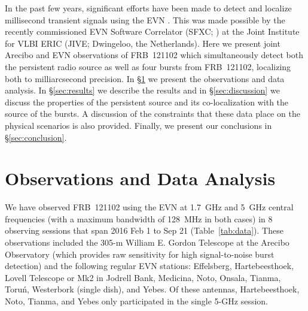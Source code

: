 \documentclass[twocolumn]{aastex61}
\newcommand{\frb}{FRB~121102\xspace}
\begin{document}
In the past few years, significant efforts have been made to detect and localize millisecond transient signals using the EVN \citep{paragi2017}. This was made possible by the recently commissioned EVN Software Correlator (SFXC; \citealt{kkp+15}) at the Joint Institute for VLBI ERIC (JIVE; Dwingeloo, the Netherlands).  Here we present joint Arecibo and EVN observations of \frb which simultaneously detect both the persistent radio source as well as four bursts from \frb, localizing both to milliarcsecond precision. In \S\ref{sec:obs} we present the observations and data analysis. In \S\ref{sec:results} we describe the results and in \S\ref{sec:discussion} we discuss the properties of the persistent source and its co-localization with the source of the bursts.  A discussion of the constraints that these data place on the physical scenarios is also provided. Finally, we present our conclusions in \S\ref{sec:conclusion}.

\section{Observations and Data Analysis} \label{sec:obs}

We have observed \frb using the EVN at 1.7~GHz and 5~GHz central frequencies (with a maximum bandwidth of 128~MHz in both cases) in 8 observing sessions that span 2016 Feb 1 to Sep 21 (Table~\ref{tab:data}). These observations included the 305-m William E. Gordon Telescope at the Arecibo Observatory (which provides raw sensitivity for high signal-to-noise burst detection) and the following regular EVN stations: Effelsberg, Hartebeesthoek, Lovell Telescope or Mk2 in Jodrell Bank, Medicina, Noto, Onsala, Tianma, Toru\'{n}, Westerbork (single dish), and Yebes.  Of these antennas, Hartebeesthoek, Noto, Tianma, and Yebes only participated in the single 5-GHz session.
\end{document}
